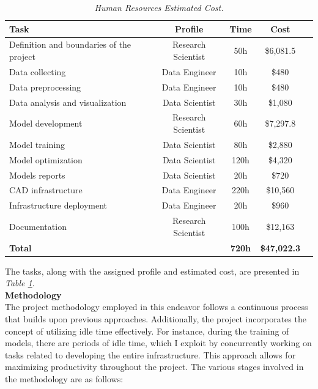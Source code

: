 \newpage

\begin{table}[H]
\centering
\begin{tabular}{lcccc}
	 \toprule
\textbf{Task} & \textbf{Profile} & \textbf{Time} & \textbf{Cost} \\
		\midrule
    Definition and boundaries of the project & Research Scientist & 50h & \$6,081.5\\
    Data collecting & Data Engineer & 10h & \$480\\
    Data preprocessing & Data Engineer & 10h & \$480 \\
    Data analysis and visualization & Data Scientist & 30h & \$1,080\\
    Model development & Research Scientist & 60h & \$7,297.8 \\
    Model training & Data Scientist & 80h & \$2,880 \\
    Model optimization & Data Scientist & 120h & \$4,320 \\
    Models reports & Data Scientist & 20h & \$720 \\
    CAD infrastructure & Data Engineer & 220h & \$10,560 \\
    Infrastructure deployment & Data Engineer & 20h & \$960 \\
    Documentation & Research Scientist & 100h & \$12,163 \\
		\midrule
    \textbf{Total} &    &  \textbf{720h} & \textbf{\$47,022.3} \\
    \bottomrule
\end{tabular}
\caption[Human Resources Estimated Cost.]{\textit{Human Resources Estimated Cost.}}
{\label{table:human_resources_cost}}
\end{table}

The tasks, along with the assigned profile and estimated cost, are presented in \textit{Table \ref{table:human_resources_cost}}. \\

\vspace{0.5cm}
\textbf{Methodology} \\

The project methodology employed in this endeavor follows a continuous process that builds upon previous approaches. Additionally, the project incorporates the concept of utilizing idle time effectively. For instance, during the training of models, there are periods of idle time, which I exploit by concurrently working on tasks related to developing the entire infrastructure. This approach allows for maximizing productivity throughout the project. The various stages involved in the methodology are as follows: \\

